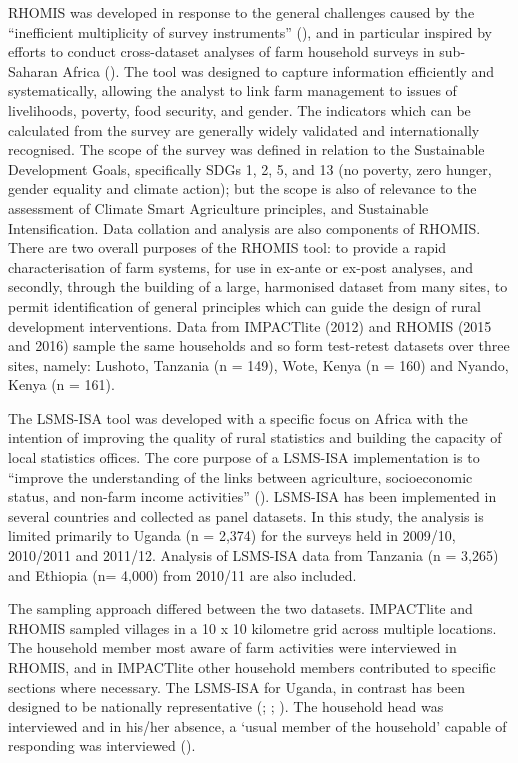 RHOMIS was developed in response to the general challenges caused by the ``inefficient multiplicity of survey instruments'' (\citealp[p.~30]{Carletto2013}), and in particular inspired by efforts to conduct cross-dataset analyses of farm household surveys in sub-Saharan Africa (\citealp{Frelat2016458}). The tool was designed to capture information efficiently and systematically, allowing the analyst to link farm management to issues of livelihoods, poverty, food security, and gender. The indicators which can be calculated from the survey are generally widely validated and internationally recognised. The scope of the survey was defined in relation to the Sustainable Development Goals, specifically SDGs 1, 2, 5, and 13 (no poverty, zero hunger, gender equality and climate action); but the scope is also of relevance to the assessment of Climate Smart Agriculture principles, and Sustainable Intensification. Data collation and analysis are also components of RHOMIS. There are two overall purposes of the RHOMIS tool: to provide a rapid characterisation of farm systems, for use in ex-ante or ex-post analyses, and secondly, through the building of a large, harmonised dataset from many sites, to permit identification of general principles which can guide the design of rural development interventions. Data from IMPACTlite (2012) and RHOMIS (2015 and 2016) sample the same households and so form test-retest datasets over three sites, namely: Lushoto, Tanzania (n = 149), Wote, Kenya (n = 160) and Nyando, Kenya (n = 161).

The LSMS-ISA tool was developed with a specific focus on Africa with the intention of improving the quality of rural statistics and building the capacity of local statistics offices. The core purpose of a LSMS-ISA implementation is to ``improve the understanding of the links between agriculture, socioeconomic status, and non-farm income activities'' (\citealp[p.~1]{WorldBank}). LSMS-ISA has been implemented in several countries and collected as panel datasets. In this study, the analysis is limited primarily to Uganda (n = 2,374) for the surveys held in 2009/10, 2010/2011 and 2011/12. Analysis of LSMS-ISA data from Tanzania (n = 3,265) and Ethiopia (n= 4,000) from 2010/11 are also included.

The sampling approach differed between the two datasets. IMPACTlite and RHOMIS sampled villages in a 10 x 10 kilometre grid across multiple locations. The household member most aware of farm activities were interviewed in RHOMIS, and in IMPACTlite other household members contributed to specific sections where necessary. The LSMS-ISA for Uganda, in contrast has been designed to be nationally representative (\citealp{UgandaBureauofStatistics2007}; \citealp{UgandaBureauofStatistics}; \citealp{UgandaBureauofStatistics2002}). The household head was interviewed and in his/her absence, a `usual member of the household' capable of responding was interviewed (\citealp{UgandaBureauofStatistics}).

